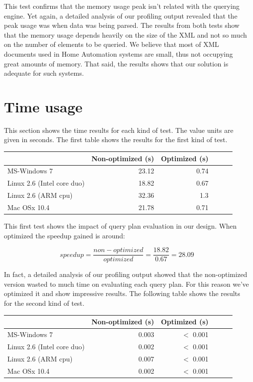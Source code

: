 \documentclass[a4paper]{report}
\begin{document}
	This test confirms that the memory usage peak isn't related with the querying engine. Yet again, a detailed analysis of our profiling output revealed that the peak usage was when data was being parsed. The results from both tests show that the memory usage depends heavily on the size of the XML and not so much on the number of elements to be queried. We believe that most of XML documents used in Home Automation systems are small, thus not occupying great amounts of memory. That said, the results shows that our solution is adequate for such systems.

\section{Time usage}\label{sec:tprof}
	This section shows the time results for each kind of test. The value units are given in seconds. The first table shows the results for the first kind of test.

	\begin{center}
  			\begin{tabular}{ | l | r | r | r | r | r | }
			    \hline
				       	       		     			 & Non-optimized (s) & Optimized (s)\\ \hline
				    MS-Windows 7   			&  23.12  & 0.74  \\ \hline
				    Linux 2.6 (Intel core duo) 	&  18.82  & 0.67  \\ \hline
				    Linux 2.6 (ARM cpu)   		&  32.36  & 1.3 \\ \hline
				    Mac OSx 10.4   			&  21.78  & 0.71 \\
			    \hline
			\end{tabular}
	\end{center}

	This first test shows the impact of query plan evaluation in our design. When optimized the speedup gained is around:

		$$speedup = \frac{non-optimized}{optimized} = \frac{18.82}{0.67} = 28.09$$

	In fact, a detailed analysis of our profiling output showed that the non-optimized version wasted to much time on evaluating each query plan. For this reason we've optimized it and show impressive results. The following table shows the results for the second kind of test.

	\begin{center}
  			\begin{tabular}{ | l | r | r | r | r | r | }
			    \hline
				       	       		     			 & Non-optimized (s) & Optimized (s)\\ \hline
				    MS-Windows 7   			&  0.003  & $<$ 0.001  \\ \hline
				    Linux 2.6 (Intel core duo) 	&  0.002  & $<$ 0.001  \\ \hline
				    Linux 2.6 (ARM cpu)   		&  0.007  & $<$ 0.001 \\ \hline
				    Mac OSx 10.4   			&  0.002  & $<$ 0.001 \\
			    \hline
			\end{tabular}
	\end{center}
\end{document}
